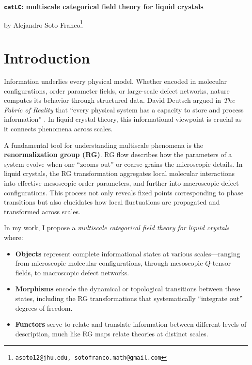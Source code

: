 


\begin{center}
\begin{huge}
	    {\textbf{\texttt{catLC}: multiscale categorical field theory for liquid crystals}}\\
	\vspace{2ex}
\end{huge}

\begin{Large}


    \vspace{2ex}

    by Alejandro Soto Franco\footnote{\texttt{asoto12@jhu.edu, sotofranco.math@gmail.com}}
\end{Large}
\end{center}


\thispagestyle{empty}

\tableofcontents

\vspace{4cm}
\pagebreak

\section{Introduction}
Information underlies every physical model. Whether encoded in molecular configurations, order parameter fields, or large-scale defect networks, nature computes its behavior through structured data. David Deutsch argued in \emph{The Fabric of Reality} that “every physical system has a capacity to store and process information” \cite{deutsch1997fabric}. In liquid crystal theory, this informational viewpoint is crucial as it connects phenomena across scales. 

A fundamental tool for understanding multiscale phenomena is the \textbf{renormalization group (RG)}. RG flow describes how the parameters of a system evolve when one “zooms out” or coarse-grains the microscopic details. In liquid crystals, the RG transformation aggregates local molecular interactions into effective mesoscopic order parameters, and further into macroscopic defect configurations. This process not only reveals fixed points corresponding to phase transitions but also elucidates how local fluctuations are propagated and transformed across scales.

In my work, I propose a \emph{multiscale categorical field theory for liquid crystals} where:
\begin{itemize}
	\item \textbf{Objects} represent complete informational states at various scales—ranging from microscopic molecular configurations, through mesoscopic \(Q\)-tensor fields, to macroscopic defect networks.
	\item \textbf{Morphisms} encode the dynamical or topological transitions between these states, including the RG transformations that systematically “integrate out” degrees of freedom.
	\item \textbf{Functors} serve to relate and translate information between different levels of description, much like RG maps relate theories at distinct scales.
\end{itemize}

